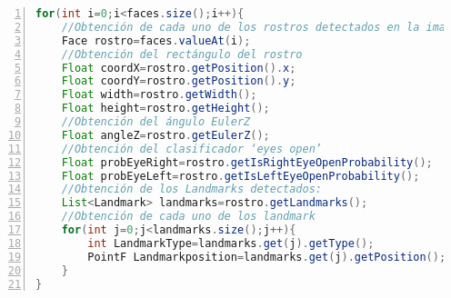 \begin{lstlisting}[language=Java,numbers=left,numberstyle={\tiny},basicstyle={\footnotesize},breaklines=true,captionpos=t,frame=no,keywordstyle={\color{blue}},commentstyle={\color{gray}},stringstyle={\color{red}},numbersep=5pt,emph={label}]
for(int i=0;i<faces.size();i++){ 
	//Obtención de cada uno de los rostros detectados en la imagen 
	Face rostro=faces.valueAt(i); 
	//Obtención del rectángulo del rostro 
	Float coordX=rostro.getPosition().x; 
	Float coordY=rostro.getPosition().y; 
	Float width=rostro.getWidth(); 
	Float height=rostro.getHeight(); 
	//Obtención del ángulo EulerZ 
	Float angleZ=rostro.getEulerZ(); 
	//Obtención del clasificador ‘eyes open’ 
	Float probEyeRight=rostro.getIsRightEyeOpenProbability(); 
	Float probEyeLeft=rostro.getIsLeftEyeOpenProbability(); 
	//Obtención de los Landmarks detectados: 
	List<Landmark> landmarks=rostro.getLandmarks(); 	 
	//Obtención de cada uno de los landmark 
	for(int j=0;j<landmarks.size();j++){ 
		int LandmarkType=landmarks.get(j).getType(); 
		PointF Landmarkposition=landmarks.get(j).getPosition(); 
	} 
} 
\end{lstlisting}

